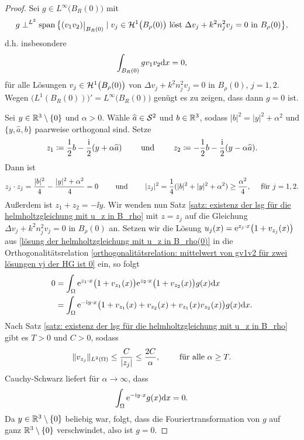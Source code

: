 \begin{proof}
	Sei \(g\in L^\infty\big(B_R(0)\big)\) mit
	\begin{equation*}
		g\perp^{L^2}\spann\big\{(v_1v_2)\restrict{B_R(0)}\mid v_j\in\H^1\big(B_\rho(0)\big)\te{ löst }\Delta v_j+k^2n_j^2v_j=0\te{ in }B_\rho(0)\big\},
	\end{equation*}
	d.h. insbesondere
	\begin{equation}
		\label{orthogonalitätsrelation: mittelwert von gv1v2 für zwei lösungen vj der HG ist 0}
		\int_{B_R(0)}gv_1v_2\mathrm{d}x=0,
	\end{equation}
	für alle Lösungen \(v_j\in\mathcal{H}^1\big(B_\rho(0)\big)\) von \(\Delta v_j+k^2n_j^2v_j=0\) in \(B_\rho(0)\), \(j=1,2\). Wegen \(\big(L^1(B_R(0))\big)'=L^\infty\big(B_R(0)\big)\) genügt es zu zeigen, dass dann \(g=0\) ist.\vspace{1.5mm}
	
	Sei \(y\in\mathbb{R}^3\setminus\{0\}\) und \(\alpha>0\). Wähle \(\widehat{a}\in\mathcal{S}^2\) und \(b\in\mathbb{R}^3\), sodass \(|b|^2=|y|^2+\alpha^2\) und \(\{y,\widehat{a},b\}\) paarweise orthogonal sind. Setze
	\begin{equation*}
		z_1\coloneqq\frac{1}{2}b-\frac{\mathrm{i}}{2}(y+\alpha\widehat{a})\qquad\text{ und }\qquad z_2\coloneqq-\frac{1}{2}b-\frac{\mathrm{i}}{2}(y-\alpha\widehat{a}).
	\end{equation*}
	Dann ist
	\begin{equation*}
		z_j\cdot z_j=\frac{|b|^2}{4}-\frac{|y|^2+\alpha^2}{4}=0\qquad\text{ und }\qquad|z_j|^2=\frac{1}{4}(|b|^2+|y|^2+\alpha^2)\geq\frac{\alpha^2}{4},\quad\text{ für }j=1,2.
	\end{equation*}
	Außerdem ist \(z_1+z_2=-\ii y\). Wir wenden nun Satz \ref{satz: existenz der lsg für die helmholtzgleichung mit u_z in B_rho} mit \(z=z_j\) auf die Gleichung \(\Delta v_j+k^2n_j^2v_j=0\) in \(B_\rho(0)\) an. Setzen wir die Lösung \(u_j(x)=\mathrm{e}^{z_j\cdot x}\big(1+v_{z_j}(x)\big)\) aus \eqref{lösung der helmholtzgleichung mit u_z in B_rho(0)} in die Orthogonalitätsrelation \eqref{orthogonalitätsrelation: mittelwert von gv1v2 für zwei lösungen vj der HG ist 0} ein, so folgt
	\begin{align*}
		0&=\int_\Omega\mathrm{e}^{z_1\cdot x}\big(1+v_{z_1}(x)\big)\mathrm{e}^{z_2\cdot x}\big(1+v_{z_2}(x)\big)g(x)\mathrm{d}x\\
		&=\int_\Omega\mathrm{e}^{-\mathrm{i} y\cdot x}\big(1+v_{z_1}(x)+v_{z_2}(x)+v_{z_1}(x)v_{z_2}(x)\big)g(x)\mathrm{d}x.
	\end{align*}
	Nach Satz \ref{satz: existenz der lsg für die helmholtzgleichung mit u_z in B_rho} gibt es \(T>0\) und \(C>0\), sodass
	\begin{equation*}
		\|v_{z_j}\|_{L^2(\Omega)}\leq\frac{C}{|z_j|}\leq\frac{2C}{\alpha},\qquad\text{ für alle }\alpha\geq T.
	\end{equation*}
	Cauchy-Schwarz liefert für \(\alpha\to\infty\), dass
	\begin{equation*}
		\int_\Omega\mathrm{e}^{-\mathrm{i} y\cdot x}g(x)\mathrm{d}x=0.
	\end{equation*}
	Da \(y\in\mathbb{R}^3\setminus\{0\}\) beliebig war, folgt, dass die Fouriertransformation von \(g\) auf ganz \(\mathbb{R}^3\setminus\{0\}\) verschwindet, also ist \(g=0\).
\end{proof}
